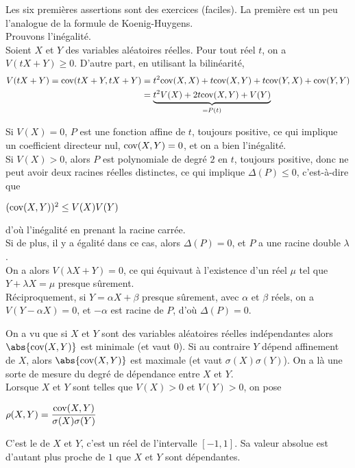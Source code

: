 \documentclass[12pt,a4paper]{report}
\begin{document}
\begin{demo}{}
Les six premières assertions sont des exercices (faciles). La première est un peu l'analogue de la formule de Koenig-Huygens. \\

Prouvons l'inégalité. \\
Soient $X$ et $Y$ des variables aléatoires réelles. Pour tout réel $t$, on a $V(tX+Y) \ge 0$. D'autre part, en utilisant la bilinéarité,
\begin{align*}
V(tX+Y) = \text{cov}(tX+Y,tX+Y) &= t^2 \text{cov}(X,X) + t \text{cov} (X,Y) + t \text{cov} (Y,X) + \text{cov}(Y,Y) \\
&= \underbrace{t^2 V(X) + 2t \text{cov}(X,Y) + V(Y)}_{=P(t)}
\end{align*}

Si $V(X) = 0$, $P$ est une fonction affine de $t$, toujours positive, ce qui implique un coefficient directeur nul, \ie $\text{cov}(X,Y) = 0$, et on a bien l'inégalité. \\

Si $V(X) > 0$, alors $P$ est polynomiale de degré $2$ en $t$, toujours positive, donc ne peut avoir deux racines réelles distinctes, ce qui implique $\Delta(P) \le 0$, c'est-à-dire que
\begin{center}
$(\text{cov}(X,Y))^2 \le V(X)V(Y)$
\end{center}
d'où l'inégalité en prenant la racine carrée. \\

Si de plus, il y a égalité dans ce cas, alors $\Delta(P) = 0$, et $P$ a une racine double $\lambda$. \\

On a alors $V(\lambda X + Y) = 0$, ce qui équivaut à l'existence d'un réel $\mu$ tel que $Y + \lambda X = \mu$ presque sûrement. \\

Réciproquement, si $Y = \alpha X + \beta$ presque sûrement, avec $\alpha$ et $\beta$ réels, on a $V(Y-\alpha X) = 0$, et $-\alpha$ est racine de $P$, d'où $\Delta(P) = 0$.
\end{demo}

\begin{remarque}{}
On a vu que si $X$ et $Y$ sont des variables aléatoires réelles indépendantes alors $\abs{\cov(X,Y)}$ est minimale (et vaut 0). Si au contraire $Y$ dépend affinement de $X$, alors $\abs{\cov(X,Y)}$ est maximale (et vaut $\sigma(X)\sigma(Y)$). On a là une sorte de mesure du degré de dépendance entre $X$ et $Y$. \\
Lorsque $X$ et $Y$ sont telles que $V(X) > 0$ et $V(Y) > 0$, on pose 
\begin{center}
$\rho(X,Y) = \dfrac{\text{cov}(X,Y)}{\sigma(X)\sigma(Y)}$
\end{center}
C'est le  de $X$ et $Y$, c'est un réel de l'intervalle $[-1,1]$. Sa valeur absolue est d'autant plus proche de $1$ que $X$ et $Y$ sont dépendantes.
\end{remarque}
\end{document}
